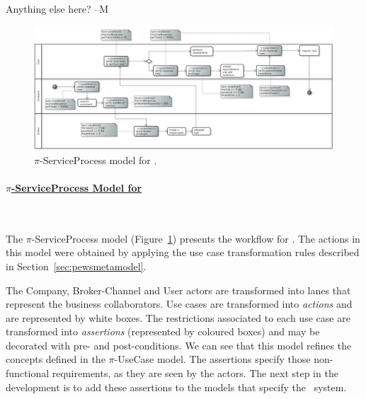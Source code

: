{\color{red} Anything else here? --M}

\begin{figure}
\centering
\includegraphics[width=1.0\textwidth]{figs/ServiceProcessGeneralCut.png}
\caption{$\pi$-ServiceProcess model for \FlyingPig.\label{fig:PiServiceProcessModel}}
\end{figure}

\paragraph{\underline{$\pi$-ServiceProcess Model for \FlyingPig}}~

The $\pi$-ServiceProcess model (Figure~\ref{fig:PiServiceProcessModel}) presents the workflow for \FlyingPig.
The actions in this model were obtained by applying the use case transformation rules described in Section~\ref{sec:pewsmetamodel}.

The \textsf{Company}, \textsf{Broker-Channel} and \textsf{User} actors are transformed into lanes that represent the business collaborators.
Use cases are transformed into \textit{actions} and are represented by white boxes.
The restrictions associated to each use case are transformed into \textit{assertions} (represented by coloured boxes) and may be decorated with pre- and post-conditions. 
We can see that this model refines the concepts defined in the $\pi$-UseCase model.
The assertions specify those non-functional requirements, as they are seen by the actors. 
The next step in the development is to add these assertions to the models that specify the \FlyingPig\ system.

